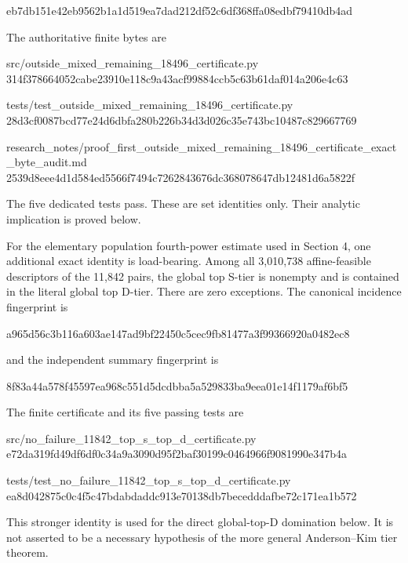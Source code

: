 \begin{CodeBlock}
eb7db151e42eb9562b1a1d519ea7dad212df52c6df368ffa08edbf79410db4ad
\end{CodeBlock}

The authoritative finite bytes are

\begin{CodeBlock}
src/outside_mixed_remaining_18496_certificate.py
314f378664052cabe23910e118c9a43acf99884ccb5c63b61daf014a206e4c63

tests/test_outside_mixed_remaining_18496_certificate.py
28d3cf0087bcd77e24d6dbfa280b226b34d3d026c35e743bc10487c829667769

research_notes/proof_first_outside_mixed_remaining_18496_certificate_exact_byte_audit.md
2539d8eee4d1d584ed5566f7494c7262843676dc368078647db12481d6a5822f
\end{CodeBlock}

The five dedicated tests pass. These are set identities only. Their
analytic implication is proved below.

For the elementary population fourth-power estimate used in Section 4,
one additional exact identity is load-bearing. Among all 3,010,738
affine-feasible descriptors of the 11,842 pairs, the global top S-tier
is nonempty and is contained in the literal global top D-tier. There are
zero exceptions. The canonical incidence fingerprint is

\begin{CodeBlock}
a965d56c3b116a603ae147ad9bf22450c5cec9fb81477a3f99366920a0482ec8
\end{CodeBlock}

and the independent summary fingerprint is

\begin{CodeBlock}
8f83a44a578f45597ea968c551d5dcdbba5a529833ba9eea01e14f1179af6bf5
\end{CodeBlock}

The finite certificate and its five passing tests are

\begin{CodeBlock}
src/no_failure_11842_top_s_top_d_certificate.py
e72da319fd49df6df0c34a9a3090d95f2baf30199c0464966f9081990e347b4a

tests/test_no_failure_11842_top_s_top_d_certificate.py
ea8d042875c0c4f5c47bdabdaddc913e70138db7becedddafbe72c171ea1b572
\end{CodeBlock}

This stronger identity is used for the direct global-top-D domination
below. It is not asserted to be a necessary hypothesis of the more
general Anderson--Kim tier theorem.

